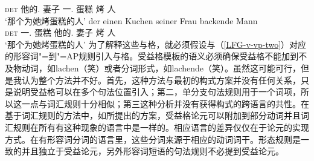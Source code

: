      \textsc{det} 他的.\dat{} 妻子 一.\acc{} 蛋糕 烤 人\\
\glt `那个为她烤蛋糕的人'
\ex
\gll der einen Kuchen seiner Frau backende Mann\\
     \textsc{det} 一.\acc{} 蛋糕  他的.\dat{} 妻子 烤 人\\
\glt `那个为她烤蛋糕的人'
\zl
为了解释这些与格，就必须假设与（\ref{LFG-v-vp-two}）对应的形容词"=到"=AP规则引入与格。受益格模板的语义必须确保受益格不能加到不及物动词，如lachen（笑）或者分词形式，如lachende（笑）。虽然这可能可行，但是我认为整个方法并不好。首先，这种方法与最初的构式方案并没有任何关系，只是说明受益格可以在多个句法位置引入；第二，单分支句法规则用于一个词项，所以这一点与词汇规则十分相似；第三这种分析并没有获得构式的跨语言的共性。在基于词汇规则的方法中，如\citet[Section~5]{BC99a}所提出的方案，受益格论元可以附加到部分动词并且词汇规则在所有有这种现象的语言中是一样的。相应语言的差异仅仅在于论元的实现方式。在有形容词分词的语言里，这些分词来源于相应的动词词干。形态规则是一致的并且独立于受益论元，另外形容词短语的句法规则不必提到受益论元。

